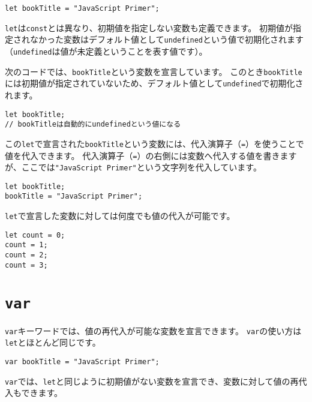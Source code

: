 \begin{lstlisting}
let bookTitle = "JavaScript Primer";
\end{lstlisting}

\texttt{let}は\texttt{const}とは異なり、初期値を指定しない変数も定義できます。
初期値が指定されなかった変数はデフォルト値として\texttt{undefined}という値で初期化されます（\texttt{undefined}は値が未定義ということを表す値です）。

次のコードでは、\texttt{bookTitle}という変数を宣言しています。
このとき\texttt{bookTitle}には初期値が指定されていないため、デフォルト値として\texttt{undefined}で初期化されます。

\begin{lstlisting}
let bookTitle;
// bookTitleは自動的にundefinedという値になる
\end{lstlisting}

この\texttt{let}で宣言された\texttt{bookTitle}という変数には、代入演算子（\texttt{=}）を使うことで値を代入できます。
代入演算子（\texttt{=}）の右側には変数へ代入する値を書きますが、ここでは\texttt{"JavaScript Primer"}という文字列を代入しています。

\begin{lstlisting}
let bookTitle;
bookTitle = "JavaScript Primer";
\end{lstlisting}

\texttt{let}で宣言した変数に対しては何度でも値の代入が可能です。

\begin{lstlisting}
let count = 0;
count = 1;
count = 2;
count = 3;
\end{lstlisting}

\hypertarget{var}{%
\section{\texorpdfstring{\texttt{var}}{var}}\label{var}}

\texttt{var}キーワードでは、値の再代入が可能な変数を宣言できます。
\texttt{var}の使い方は\texttt{let}とほとんど同じです。

\begin{lstlisting}
var bookTitle = "JavaScript Primer";
\end{lstlisting}

\texttt{var}では、\texttt{let}と同じように初期値がない変数を宣言でき、変数に対して値の再代入もできます。

